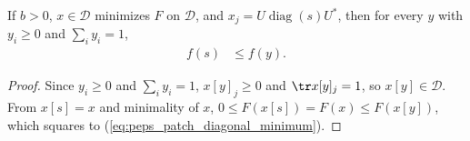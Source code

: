 \begin{lemma}
    \label{thm:peps_patch_diagonal_minimum}
    \leanok
    If $b>0$, $x\in\mathcal D$ minimizes $F$ on $\mathcal D$, and
    $x_j=U\operatorname{diag}(s)U^*$, then for every $y$ with
    $y_i\ge0$ and $\sum_i y_i=1$,
    \begin{align}
        f(s) & \le f(y).
        \label{eq:peps_patch_diagonal_minimum}
    \end{align}
\end{lemma}
\begin{proof}
    \leanok
    Since $y_i\ge0$ and $\sum_i y_i=1$, $x[y]_j\ge0$ and $\tr x[y]_j=1$, so $x[y]\in\mathcal D$.
    From $x[s]=x$ and minimality of $x$, $0\le F(x[s])=F(x)\le F(x[y])$, which squares to (\ref{eq:peps_patch_diagonal_minimum}).
\end{proof}

